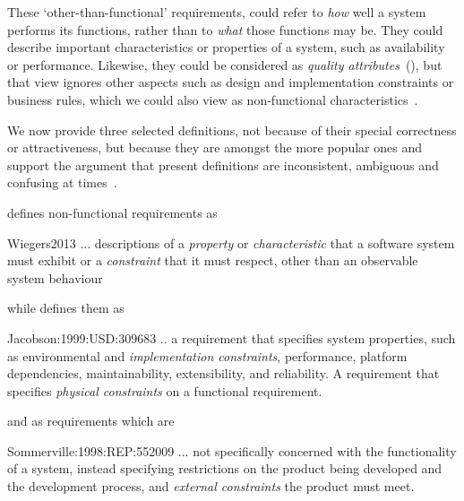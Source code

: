 \documentclass[dissertation,final]{softeng}
\begin{document}
{These `other-than-functional' requirements, could refer to \emph{how} well a system performs its functions, rather than to \emph{what} those functions may be. They could describe important characteristics or properties of a system, such as availability or performance. Likewise, they could be considered as \emph{quality attributes}~(), but that view ignores other aspects such as design and implementation constraints or business rules, which we could also view as non-functional characteristics~\citep{Wiegers2013}.

We now provide three selected definitions, not because of their special correctness or attractiveness, but because they are amongst the more popular ones and support the argument that present definitions are inconsistent, ambiguous and confusing at times~\citep{Glinz:2007ehba}.

\citet{Wiegers2013} defines non-functional requirements as
\begin{displaycquote}{Wiegers2013}
... descriptions of a \emph{property} or \emph{characteristic} that a software system must exhibit or a \emph{constraint} that it must respect, other than an observable system behaviour
\end{displaycquote}

while \citet{Jacobson:1999:USD:309683} defines them as
\begin{displaycquote}{Jacobson:1999:USD:309683}
.. a requirement that specifies system properties, such as environmental and \emph{implementation constraints}, performance, platform dependencies, maintainability, extensibility, and reliability. A requirement that specifies \emph{physical constraints} on a functional requirement.
\end{displaycquote}

and \citet{Sommerville:1998:REP:552009} as requirements which are
\begin{displaycquote}{Sommerville:1998:REP:552009}
... not specifically concerned with the functionality of a system, instead specifying restrictions on the product being developed and the development process, and \emph{external constraints} the product must meet.
\end{displaycquote}

}
\end{document}
